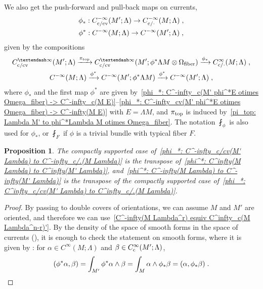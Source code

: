 \documentclass{memo-l}
\theoremstyle{plain}
\newtheorem{prop}[thm]{Proposition}
\theoremstyle{definition}
\theoremstyle{remark}
\newcommand{\fiber}{{\text{\rm fiber}}}
\newcommand{\topd}{{\text{\rm top}}}
\newcommand{\co}{{\text{\rm c}}}
\newcommand{\cv}{{\text{\rm cv}}}
\newcommand{\Cinftyc}{C^\infty_{\text{\rm c}}}
\numberwithin{section}{chapter}
\numberwithin{equation}{section}%
\begin{document}
We also get the push-forward and pull-back maps on currents,
\begin{gather}
\phi_*:C^{-\infty}_{\co/\cv}(M';\Lambda)\to C^{-\infty}_{\co/{\cdot}}(M;\Lambda)\;,
\label{phi_*: C^-infty_c/cv(M' Lambda) to C^-infty_c/.(M Lambda)}\\
\phi^*:C^{-\infty}(M;\Lambda)\to C^{-\infty}(M';\Lambda)\;,
\label{phi^*: C^-infty(M Lambda) to C^-infty(M' Lambda)}
\end{gather}
given by the compositions
\begin{gather}
C^{–\infty}_{\co/\cv}(M';\Lambda)\xrightarrow{\pi_\topd}C^{–\infty}_{\co/\cv}(M';\phi^*\Lambda M\otimes\Omega_\fiber)
\xrightarrow{\phi_*}C^\infty_{\co/{\cdot}}(M;\Lambda)\;,
\label{composition -push-forward - currents}\\
C^{-\infty}(M;\Lambda)\xrightarrow{\phi^*}C^{-\infty}(M';\phi^*\Lambda M)\xrightarrow{\phi^*}C^{-\infty}(M';\Lambda)\;,
\label{composition - pull-back - currents}
\end{gather}
where $\phi_*$ and the first map $\phi^*$ are given by~\eqref{phi_*: C^-infty_c(M' phi^*E otimes Omega_fiber) -> C^-infty_c(M E)}--\eqref{phi_*: C^-infty_cv(M' phi^*E otimes Omega_fiber) -> C^-infty(M E)} with $E=\Lambda M$, and $\pi_\topd$ is induced by~\eqref{pi_top: Lambda M' to phi^*Lambda M otimes Omega_fiber}. The notation $\fint_\phi$ is also used for $\phi_*$, or $\fint_F$ if $\phi$ is a trivial bundle with typical fiber $F$.

\begin{prop}\label{p: phi_* is transpose of phi^* - forms - currents}
The compactly supported case of~\eqref{phi_*: C^-infty_c/cv(M' Lambda) to C^-infty_c/.(M Lambda)} is the transpose of~\eqref{phi^*: C^infty(M Lambda) to C^infty(M' Lambda)}, and~\eqref{phi^*: C^-infty(M Lambda) to C^-infty(M' Lambda)} is the transpose of the compactly supported case of~\eqref{phi_*: C^infty_c/cv(M' Lambda) to C^infty_c/.(M Lambda)}.
\end{prop}

\begin{proof}
By passing to double covers of orientations, we can assume $M$ and $M'$ are oriented, and therefore we can use~\eqref{C^-infty(M Lambda^r) equiv C^infty_c(M Lambda^n-r)'}. By the density of the space of smooth forms in the space of currents (), it is enough to check the statement on smooth forms, where it is given by \cite[Proposition~6.15~(b)]{BottTu1982}: for $\alpha\in C^\infty(M;\Lambda)$ and $\beta\in\Cinftyc(M';\Lambda)$,
\[
(\phi^*\alpha,\beta)=\int_{M'}\phi^*\alpha\wedge\beta=\int_M\alpha\wedge\phi_*\beta=(\alpha,\phi_*\beta)\;.\qedhere
\]
\end{proof} 
\end{document}
